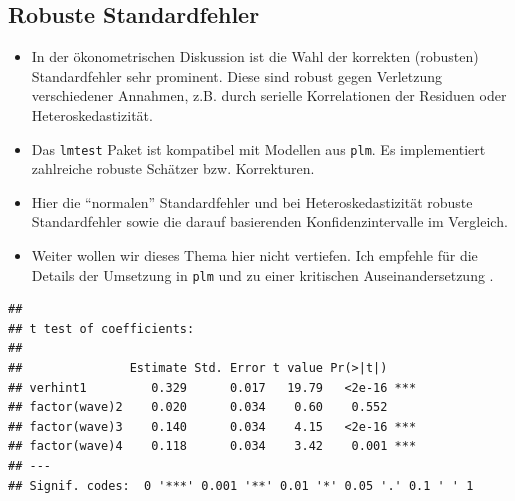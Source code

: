 \documentclass[
]{book}
\newenvironment{Shaded}{\begin{snugshade}}{\end{snugshade}}
\newcommand{\CommentTok}[1]{\textcolor[rgb]{0.56,0.35,0.01}{\textit{#1}}}
\newcommand{\DecValTok}[1]{\textcolor[rgb]{0.00,0.00,0.81}{#1}}
\newcommand{\KeywordTok}[1]{\textcolor[rgb]{0.13,0.29,0.53}{\textbf{#1}}}
\newcommand{\NormalTok}[1]{#1}
\newcommand{\OperatorTok}[1]{\textcolor[rgb]{0.81,0.36,0.00}{\textbf{#1}}}
\newcommand{\StringTok}[1]{\textcolor[rgb]{0.31,0.60,0.02}{#1}}
\begin{document}
\hypertarget{robuste-standardfehler}{%
\subsection*{Robuste Standardfehler}\label{robuste-standardfehler}}

\begin{itemize}
\item
  In der ökonometrischen Diskussion ist die Wahl der korrekten (robusten) Standardfehler sehr prominent. Diese sind robust gegen Verletzung verschiedener Annahmen, z.B. durch serielle Korrelationen der Residuen oder Heteroskedastizität.
\item
  Das \texttt{lmtest} Paket \citep{R-lmtest} ist kompatibel mit Modellen aus \texttt{plm}. Es implementiert zahlreiche robuste Schätzer bzw. Korrekturen.
\item
  Hier die ``normalen'' Standardfehler und bei Heteroskedastizität robuste Standardfehler sowie die darauf basierenden Konfidenzintervalle im Vergleich.
\item
  Weiter wollen wir dieses Thema hier nicht vertiefen. Ich empfehle für die Details der Umsetzung in \texttt{plm} \citet{plm2017} und zu einer kritischen Auseinandersetzung \citet{kingHowRobustStandard2015}.
\end{itemize}

\begin{Shaded}
\end{Shaded}

\begin{verbatim}
## 
## t test of coefficients:
## 
##               Estimate Std. Error t value Pr(>|t|)    
## verhint1         0.329      0.017   19.79   <2e-16 ***
## factor(wave)2    0.020      0.034    0.60    0.552    
## factor(wave)3    0.140      0.034    4.15   <2e-16 ***
## factor(wave)4    0.118      0.034    3.42    0.001 ***
## ---
## Signif. codes:  0 '***' 0.001 '**' 0.01 '*' 0.05 '.' 0.1 ' ' 1
\end{verbatim}

\begin{Shaded}
\end{Shaded}
\end{document}
